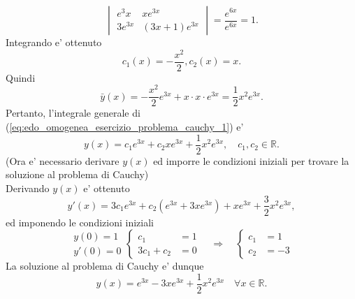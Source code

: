\begin{example}
\begin{equation*}
{		}{
			\begin{vmatrix}
				e^3x & x e^{3x}\\
				3 e^{3x} & (3x+1) e^{3x}
			\end{vmatrix}
		}= \frac{e^{6x}}{e^{6x}} = 1.
	\end{equation*}
	Integrando e' ottenuto
	\begin{equation*}
		c_1(x) = -\frac{x^2}{2}, c_2(x) = x.
	\end{equation*}
	Quindi
	\begin{equation*}
		\bar y(x) = -\frac{x^2}{2} e^{3x} + x\cdot x\cdot e^{3x} = \frac{1}{2} x^2 e^{3x}.
	\end{equation*}
	Pertanto, l'integrale generale di (\ref{eq:edo_omogenea_esercizio_problema_cauchy_1}) e'
	\begin{equation*}
		y(x) = c_1 e^{3x} + c_2 x e^{3x} + \frac{1}{2} x^2 e ^{3x},\quad c_1,c_2\in\mathbb{R}.
	\end{equation*}
	(Ora e' necessario derivare $y(x)$ ed imporre le condizioni iniziali per trovare la soluzione al problema di Cauchy)\\
	Derivando $y(x)$ e' ottenuto
	\begin{equation*}
		y'(x) = 3c_1 e^{3x} + c_2(e^{3x} + 3xe^{3x}) + xe^{3x} + \frac{3}{2}x^2 e^{3x},
	\end{equation*}
	ed imponendo le condizioni iniziali
	\begin{equation*}
		\begin{matrix}
			y(0) = 1\\
			y'(0) = 0
		\end{matrix}
		\begin{cases}
			c_1 &= 1\\
			3c_1 + c_2 &=0
		\end{cases}\quad\Rightarrow\quad
		\begin{cases}
			c_1 &= 1\\
			c_2 &= -3
		\end{cases}
	\end{equation*}
	La soluzione al problema di Cauchy e' dunque
	\begin{equation*}
		y(x) = e^{3x} - 3xe^{3x} + \frac{1}{2} x^2 e^{3x}\quad \forall x\in\mathbb{R}.
	\end{equation*}
\end{example}

